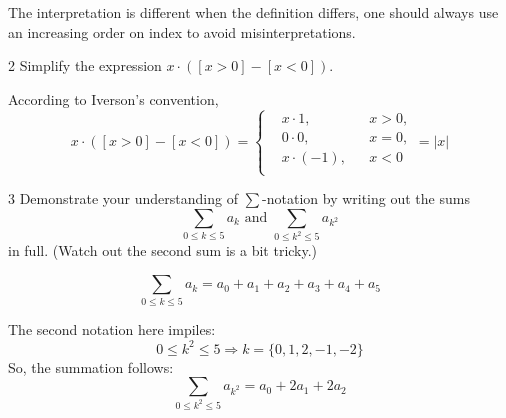 \documentclass[a4paper,12pt]{article}
\makeatletter
\newtheorem*{solution}{Solution}
\theoremstyle{definition}
\renewenvironment{solution}[1][Solution] {\par\pushQED{\qed}\normalfont\topsep6\p@\@plus6\p@\relax\trivlist\item[\hskip\labelsep\bfseries#1\@addpunct{.}]\ignorespaces}{\popQED\endtrivlist\@endpefalse} \makeatother
\newenvironment{problems}{\begin{list}{}{\renewcommand{\makelabel}[1]{\textbf{##1}\hfil}}}{\end{list}}
\makeatother
\begin{document}
\begin{problems}
\begin{solution}
        The interpretation is different when the definition differs, one should always use an increasing order on index to avoid misinterpretations.
    \end{solution}
    \item[2] Simplify the expression $x\cdot ([x>0]-[x<0])$. 
    \begin{solution}
        According to Iverson's convention, 
        \begin{equation*}
            x\cdot([x>0]-[x<0]) = \left\{\begin{aligned}
                &x\cdot 1,&&x>0,\\
                &0\cdot 0,&&x=0,\\
                &x\cdot(-1),&&x<0\\
            \end{aligned}\right. = |x|
        \end{equation*}
    \end{solution} 
    \item[3] Demonstrate your understanding of $\sum$-notation by writing out the sums
    \begin{equation*}
        \sum_{0\leq k\leq 5}a_k \text{ and } \sum_{0\leq k^2\leq 5}a_{k^2}
    \end{equation*} 
    in full. (Watch out the second sum is a bit tricky.)
    \begin{solution}
        \begin{equation*}
            \sum_{0\leq k\leq 5}a_k = a_0 + a_1 + a_2 + a_3 + a_4 + a_5
        \end{equation*}

        The second notation here impiles:
        \begin{equation*}
            0\leq k^2\leq 5 \Rightarrow k = \{0,1,2,-1,-2\}
        \end{equation*}
        So, the summation follows:
        \begin{equation*}
            \sum_{0\leq k^2\leq 5}a_{k^2} = a_0 + 2a_1 + 2a_2
        \end{equation*}


\end{solution}
\end{problems}
\end{document}
